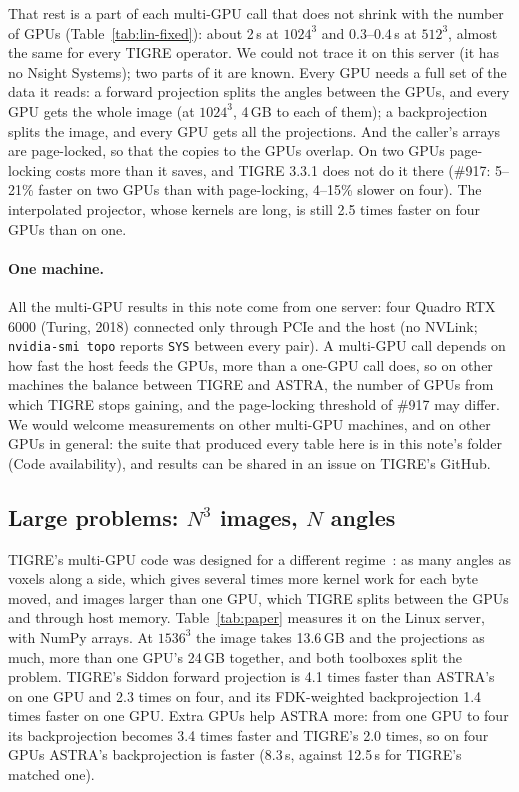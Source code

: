 \documentclass[11pt,a4paper]{article}
\begin{document}
That rest is a part of each multi-GPU call that does not shrink with the number of GPUs
(Table~\ref{tab:lin-fixed}): about 2\,s at $1024^3$ and 0.3--0.4\,s at $512^3$, almost the same for every TIGRE
operator. We could not trace it on this server (it has no Nsight Systems); two parts of it are known. Every GPU
needs a full set of the data it reads: a forward projection splits the angles between the GPUs, and every GPU
gets the whole image (at $1024^3$, 4\,GB to each of them); a backprojection splits the image, and every GPU gets
all the projections. And the caller's arrays are page-locked, so that the copies to the GPUs overlap. On two GPUs
page-locking costs more than it saves, and TIGRE 3.3.1 does not do it there (\#917: 5--21\% faster on two GPUs
than with page-locking, 4--15\% slower on four). The interpolated projector, whose kernels are long, is still 2.5
times faster on four GPUs than on one.

\paragraph{One machine.} All the multi-GPU results in this note come from one server: four Quadro RTX 6000
(Turing, 2018) connected only through PCIe and the host (no NVLink;
\texttt{nvidia-smi topo} reports \texttt{SYS} between every pair). A multi-GPU call depends on how fast the host
feeds the GPUs, more than a one-GPU call does, so on other machines the balance between TIGRE and ASTRA, the
number of GPUs from which TIGRE stops gaining, and the page-locking threshold of \#917 may differ. We would
welcome measurements on other multi-GPU machines, and on other GPUs in general: the suite that produced every
table here is in this note's folder (Code availability), and results can be shared in an issue on TIGRE's GitHub.

\subsection{Large problems: $N^3$ images, $N$ angles}\label{sec:large}
TIGRE's multi-GPU code was designed for a different regime~\cite{tigre2020multigpu}: as many angles as voxels
along a side, which gives several times more kernel work for each byte moved, and images larger than one GPU,
which TIGRE splits between the GPUs and through host memory. Table~\ref{tab:paper} measures it on the Linux
server, with NumPy arrays. At $1536^3$ the image takes 13.6\,GB and the projections as much, more than one GPU's
24\,GB together, and both toolboxes split the problem. TIGRE's Siddon forward projection is 4.1 times faster than
ASTRA's on one GPU and 2.3 times on four, and its FDK-weighted backprojection 1.4 times faster on one GPU. Extra
GPUs help ASTRA more: from one GPU to four its backprojection becomes 3.4 times faster and TIGRE's 2.0 times, so
on four GPUs ASTRA's backprojection is faster (8.3\,s, against 12.5\,s for TIGRE's matched one).
\end{document}
